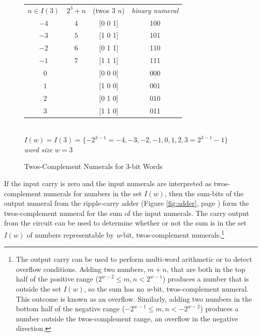\begin{figure}
\begin{center}
\begin{tabular}{cccc}
 $n \in I(3)$ & $2^3+n$  & (twos $3$ $n$)   & \emph{binary numeral} \\
 $-4$         & $4$      & [0 0 1]          & 100                   \\
 $-3$         & $5$      & [1 0 1]          & 101                   \\
 $-2$         & $6$      & [0 1 1]          & 110                   \\
 $-1$         & $7$      & [1 1 1]          & 111                   \\
 $~~0$        &          & [0 0 0]          & 000                   \\
 $~~1$        &          & [1 0 0]          & 001                   \\
 $~~2$        &          & [0 1 0]          & 010                   \\
 $~~3$        &          & [1 1 0]          & 011                   \\
\end{tabular}
\\ $I(w) = I(3) = \{-2^{3-1}=-4, -3, -2, -1, 0, 1, 2, 3=2^{3-1}-1\}$
\\ \emph{word size} $w = 3$
\end{center}
\caption{Twos-Complement Numerals for 3-bit Words}
\label{fig:2s-comp-3bit}
\end{figure}

If the input carry is zero and
the input numerals are interpreted
as twos-complement numerals for numbers in the set $I(w)$,
then the sum-bits of the output numeral from the ripple-carry adder
(Figure \ref{fig:adder}, page \pageref{fig:adder})
form the twos-complement numeral for the sum of the input numerals.
The carry output from the circuit can be used to determine
whether or not the sum is in the set $I(w)$ of numbers representable
by \emph{w}-bit, twos-complement numerals.\footnote{The
output carry can be used to perform multi-word arithmetic
or to detect overflow conditions. Adding two numbers, $m+n$,
that are both in the top half of the positive range
($2^{w-2} \leq m, n < 2^{w-1}$) produces a number that is
outside the set $I(w)$, so the sum has no \emph{w}-bit, twos-complement numeral.
This outcome is known as an overflow.
Similarly, adding two numbers in the bottom half of the
negative range ($-2^{w-1} \leq m,n < -2^{w-2}$)
produces a number outside the twos-complement range, an overflow in the negative direction.}

